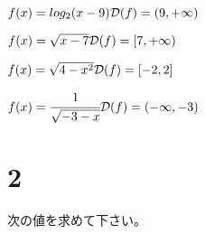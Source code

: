 \documentclass[fleqn]{jsarticle}
\begin{document}
    \begin{multicols}{2}
        \begin{description}
            \setlength{\itemsep}{0.5cm}

                \item[(1)]
                    $ f(x) = log_2(x-9) \\
                    \mathcal{D}(f) = (9, +\infty) $

                \item[(2)]
                    $ f(x) = \sqrt{x - 7} \\
                    \mathcal{D}(f) = [7, +\infty) $

                \item[(3)]
                    $ f(x) = \sqrt{4 - x^2} \\
                    \mathcal{D}(f) = [-2, 2] $

                \item[(4)]
                    $ f(x) = \cfrac{1}{\sqrt{-3-x}} \\
                    \mathcal{D}(f) = (-\infty, -3) $

        \end{description}
    \end{multicols}

    \newpage

    \section*{2}
    次の値を求めて下さい。
\end{document}
